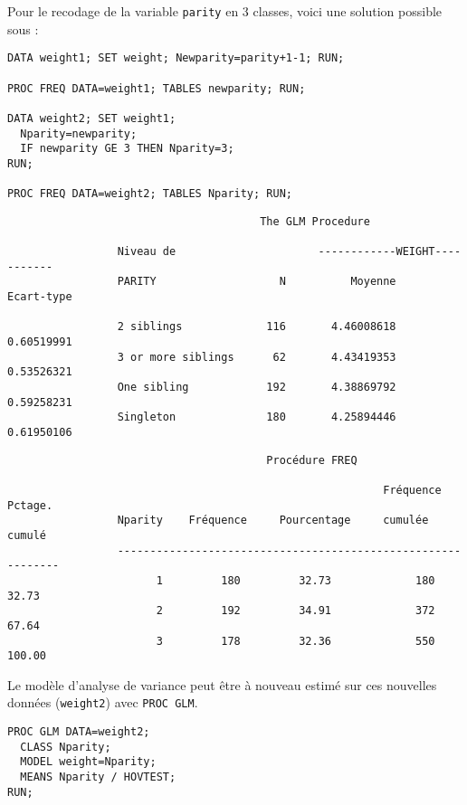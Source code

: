 Pour le recodage de la variable \texttt{parity} en 3 classes, voici une
solution possible sous \SAS :
\begin{verbatim}
DATA weight1; SET weight; Newparity=parity+1-1; RUN;

PROC FREQ DATA=weight1; TABLES newparity; RUN;

DATA weight2; SET weight1;
  Nparity=newparity; 
  IF newparity GE 3 THEN Nparity=3;
RUN;

PROC FREQ DATA=weight2; TABLES Nparity; RUN;
\end{verbatim}

\begin{verbatim}
                                       The GLM Procedure

                 Niveau de                      ------------WEIGHT-----------
                 PARITY                   N          Moyenne       Ecart-type

                 2 siblings             116       4.46008618       0.60519991
                 3 or more siblings      62       4.43419353       0.53526321
                 One sibling            192       4.38869792       0.59258231
                 Singleton              180       4.25894446       0.61950106
\end{verbatim}

\begin{verbatim}
                                        Procédure FREQ

                                                          Fréquence    Pctage.
                 Nparity    Fréquence     Pourcentage     cumulée      cumulé
                 -------------------------------------------------------------
                       1         180         32.73             180      32.73
                       2         192         34.91             372      67.64
                       3         178         32.36             550     100.00
\end{verbatim}

Le modèle d'analyse de variance peut être à nouveau estimé sur ces nouvelles
données (\texttt{weight2}) avec \texttt{PROC GLM}.
\begin{verbatim}
PROC GLM DATA=weight2; 
  CLASS Nparity; 
  MODEL weight=Nparity;
  MEANS Nparity / HOVTEST;
RUN;
\end{verbatim}

